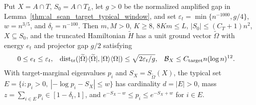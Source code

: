 \begin{lemma}
    Put $X=A\cap T$, $S_0=A\cap T_L$, let $g>0$ be the normalized amplified gap in
    Lemma~\ref{thm:al_scan_target_typical_window}, and set
    $\varepsilon_t=\min\{n^{-1000},g/4\}$, $w=n^{3/5}$, and $\delta_t=n^{-100}$.
    Then $m,M>0$, $K\geq8$, $8Km\leq L$, $|S_0|\leq(C_T+1)n^2$,
    $X\subseteq S_0$, and the truncated Hamiltonian $\widetilde H$ has a unit ground vector
    $\widetilde\Omega$ with energy $e_t$ and projector gap $g/2$ satisfying
    \begin{align}
        0\leq e_t    & \leq\varepsilon_t,                       &
        \operatorname{dist}_{\rm tr}
        (|\widetilde\Omega\rangle\langle\widetilde\Omega|,
        |\Omega\rangle\langle\Omega|)
                     & \leq\sqrt{2\varepsilon_t/g},             &
        \mathcal B_X & \leq C_{\rm target}n(\log n)^{12}.\notag
    \end{align}
    With target-marginal eigenvalues $p_i$ and $S_X=S_{\widetilde\Omega}(X)$, the typical set
    $E=\{i:p_i>0,\ |{-\log p_i}-S_X|\leq w\}$ has cardinality $d=|E|>0$, mass $z=\sum_{i\in E}p_i\in[1-\delta_t,1]$, and $e^{-S_X-w}\leq p_i\leq e^{-S_X+w}$ for $i\in E$.


\end{lemma}
